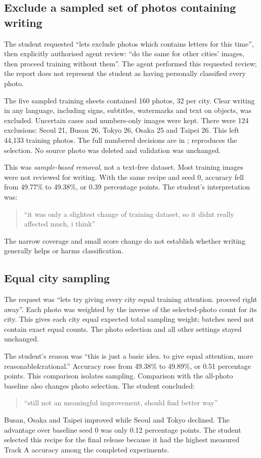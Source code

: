\documentclass[11pt]{article}
\begin{document}
\subsection*{Exclude a sampled set of photos containing writing}
The student requested ``lets exclude photos which contains letters for this time'', then explicitly authorised agent review: ``do the same for other cities' images, then proceed training without them''. The agent performed this requested review; the report does not represent the student as having personally classified every photo.

The five sampled training sheets contained 160 photos, 32 per city. Clear writing in any language, including signs, subtitles, watermarks and text on objects, was excluded. Uncertain cases and numbers-only images were kept. There were 124 exclusions: Seoul 21, Busan 26, Tokyo 26, Osaka 25 and Taipei 26. This left 44,133 training photos. The full numbered decisions are in ;  reproduces the selection. No source photo was deleted and validation was unchanged.

This was \emph{sample-based removal}, not a text-free dataset. Most training images were not reviewed for writing. With the same recipe and seed 0, accuracy fell from 49.77\% to 49.38\%, or 0.39 percentage points. The student's interpretation was:
\begin{quote}
``it was only a slightest change of training dataset, so it didnt really affected much, i think''
\end{quote}
The narrow coverage and small score change do not establish whether writing generally helps or harms classification.

\subsection*{Equal city sampling}
The request was ``lets try giving every city equal training attention. proceed right away''. Each photo was weighted by the inverse of the selected-photo count for its city. This gives each city equal expected total sampling weight; batches need not contain exact equal counts. The photo selection and all other settings stayed unchanged.

The student's reason was ``this is just a basic idea. to give equal attention, more reasonable\&rational.'' Accuracy rose from 49.38\% to 49.89\%, or 0.51 percentage points. This comparison isolates sampling. Comparison with the all-photo baseline also changes photo selection. The student concluded:
\begin{quote}
``still not an meaningful improvement, should find better way''
\end{quote}
Busan, Osaka and Taipei improved while Seoul and Tokyo declined. The advantage over baseline seed 0 was only 0.12 percentage points. The student selected this recipe for the final release because it had the highest measured Track A accuracy among the completed experiments.
\end{document}
